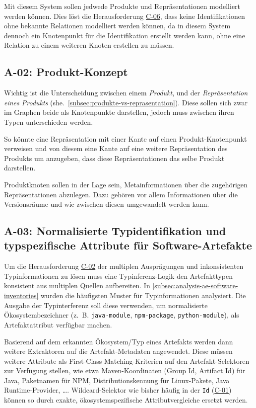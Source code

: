 Mit diesem System sollen jedwede Produkte und Repräsentationen modelliert werden können.
Dies löst die Herausforderung \hyperref[subsec:c-06-falle-ohne-aktion-konnen-nicht-dokumentiert-werden]{C-06}, dass keine Identifikationen ohne bekannte Relationen modelliert werden können, da in diesem System dennoch ein Knotenpunkt für die Identifikation erstellt werden kann, ohne eine Relation zu einem weiteren Knoten erstellen zu müssen.

\subsection{A-02: Produkt-Konzept}\label{subsec:req-product-concept}

Wichtig ist die Unterscheidung zwischen einem \textit{Produkt}, und der \textit{Repräsentation eines Produkts} (she.\ \autoref{subsec:produkte-vs-reprasentation}).
Diese sollen sich zwar im Graphen beide als Knotenpunkte darstellen, jedoch muss zwischen ihren Typen unterschieden werden.

So könnte eine Repräsentation mit einer Kante auf einen Produkt-Knotenpunkt verweisen und von diesem eine Kante auf eine weitere Repräsentation des Produkts um anzugeben, dass diese Repräsentationen das selbe Produkt darstellen.

Produktknoten sollen in der Lage sein, Metainformationen über die zugehörigen Repräsentationen abzulegen.
Dazu gehören vor allem Informationen über die Versionsräume und wie zwischen diesen umgewandelt werden kann.

\subsection{A-03: Normalisierte Typidentifikation und typspezifische Attribute für Software-Artefakte}\label{subsec:req-type-specific-matching}

Um die Herausforderung \hyperref[subsec:c-02-uneindeutige-artefakt-typinformation]{C-02} der multiplen Ausprägungen und inkonsistenten Typinformationen zu lösen muss eine Typinferenz-Logik den Artefakttypen konsistent aus multiplen Quellen aufbereiten.
In \autoref{subsec:analysis-ae-software-inventories} wurden die häufigsten Muster für Typinformationen analysiert.
Die Ausgabe der Typinterferenz soll diese verwenden, um normalisierte Ökosystembezeichner (z.\ B. \texttt{java-module}, \texttt{npm-package}, \texttt{python-module}), als Artefaktattribut verfügbar machen.

Basierend auf dem erkannten Ökosystem/Typ eines Artefakts werden dann weitere Extraktoren auf die Artefakt-Metadaten angewendet.
Diese müssen weitere Attribute als First-Class Matching-Kriterien auf den Artefakt-Selektoren zur Verfügung stellen, wie etwa Maven-Koordinaten (Group Id, Artifact Id) für Java, Paketnamen für NPM, Distributionskennung für Linux-Pakete, Java Runtime-Provider, \ldots.
Wildcard-Selektor wie bisher häufig in der \texttt{Id} (\hyperref[subsec:c-01-unspezifische-identifikation-von-artefakten]{C-01}) können so durch exakte, ökosystemspezifische Attributvergleiche ersetzt werden.

